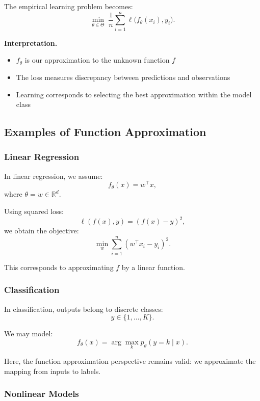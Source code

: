 \medskip

\noindent
The empirical learning problem becomes:
\[
\min_{\theta \in \Theta} \; \frac{1}{n} \sum_{i=1}^n \ell\big(f_\theta(x_i), y_i\big).
\]

\medskip

\noindent
\textbf{Interpretation.}
\begin{itemize}
    \item $f_\theta$ is our approximation to the unknown function $f$
    \item The loss measures discrepancy between predictions and observations
    \item Learning corresponds to selecting the best approximation within the model class
\end{itemize}

\subsection{Examples of Function Approximation}

\subsubsection{Linear Regression}

In linear regression, we assume:
\[
f_\theta(x) = w^\top x,
\]
where $\theta = w \in \mathbb{R}^d$.

\medskip

\noindent
Using squared loss:
\[
\ell(f(x), y) = (f(x) - y)^2,
\]
we obtain the objective:
\[
\min_w \sum_{i=1}^n (w^\top x_i - y_i)^2.
\]

\medskip

\noindent
This corresponds to approximating $f$ by a linear function.

\subsubsection{Classification}

In classification, outputs belong to discrete classes:
\[
y \in \{1, \dots, K\}.
\]

\medskip

\noindent
We may model:
\[
f_\theta(x) = \arg\max_k p_\theta(y = k \mid x).
\]

\medskip

\noindent
Here, the function approximation perspective remains valid: we approximate the mapping from inputs to labels.

\subsubsection{Nonlinear Models}

